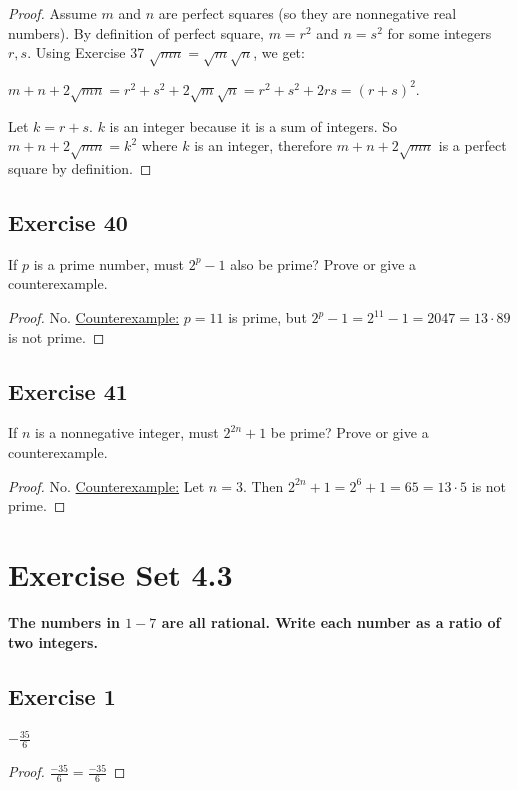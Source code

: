 \documentclass[14pt]{extarticle}
\newcommand{\dps}{\displaystyle}
\newcommand{\cy}{\color{cyan}}
\begin{document}
\begin{proof}
Assume $m$ and $n$ are perfect squares (so they are nonnegative real numbers). By definition of perfect square, $m = r^2$ and $n = s^2$ for some integers $r, s$. Using Exercise 37 $\sqrt{mn} = \sqrt{m}\sqrt{n}$, we get:

$m + n + 2\sqrt{mn} = r^2 + s^2 + 2\sqrt{m}\sqrt{n} = r^2 + s^2 + 2rs = (r+s)^2$.

Let $k = r+s$. $k$ is an integer because it is a sum of integers. So $m + n + 2\sqrt{mn} = k^2$ where $k$ is an integer, therefore $m + n + 2\sqrt{mn}$ is a perfect square by definition.

\end{proof}

\subsection{Exercise 40}
If $p$ is a prime number, must $2^p - 1$ also be prime? Prove or give a counterexample.

\begin{proof}
No. \underline{Counterexample:} $p = 11$ is prime, but $2^p - 1 = 2^{11} - 1 = 2047 = 13 \cdot 89$ is not prime.
\end{proof}

\subsection{Exercise 41}
If $n$ is a nonnegative integer, must $2^{2n} + 1$ be prime? Prove or give a counterexample.

\begin{proof}
No. \underline{Counterexample:} Let $n = 3$. Then $2^{2n} + 1 = 2^{6} + 1 = 65 = 13 \cdot 5$ is not prime.
\end{proof}

\section{Exercise Set 4.3}

{\bf \cy The numbers in $1-7$ are all rational. Write each number as a ratio of two integers.}

\subsection{Exercise 1}
$\dps-\frac{35}{6}$

\begin{proof}
$\frac{-35}{6} = \frac{-35}{6}$
\end{proof}
\end{document}
